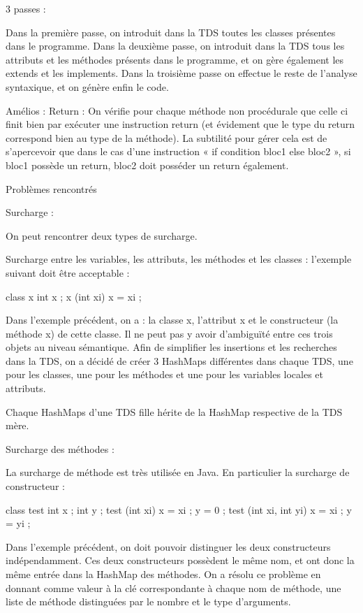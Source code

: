 
3 passes :

Dans la première passe, on introduit dans la TDS toutes les classes présentes dans le programme.
Dans la deuxième passe, on introduit dans la TDS tous les attributs et les méthodes présents dans le programme, et on gère également les extends et les implements.
Dans la troisième passe on effectue le reste de l'analyse syntaxique, et on génère enfin le code.



Amélios :
Return :
On vérifie pour chaque méthode non procédurale que celle ci finit bien par
exécuter une instruction return (et évidement que le type du return correspond
bien au type de la méthode). La subtilité pour gérer cela est de s'apercevoir
que dans le cas d'une instruction « if condition {bloc1} else {bloc2} », si
bloc1 possède un return, bloc2 doit posséder un return également.


Problèmes rencontrés

Surcharge :

On peut rencontrer deux types de surcharge.

Surcharge entre les variables, les attributs, les méthodes et les classes :
l'exemple suivant doit être acceptable :

class x {
  int x ;
  x (int xi) {
    x = xi ;
  }
}

Dans l'exemple précédent, on a : la classe x, l'attribut x et le constructeur
(la méthode x) de cette classe. Il ne peut pas y avoir d’ambiguïté entre ces
trois objets au niveau sémantique. Afin de simplifier les insertions et les
recherches dans la TDS, on a décidé de créer 3 HashMaps différentes dans chaque
TDS, une pour les classes, une pour les méthodes et une pour les variables
locales et attributs.

Chaque HashMaps d'une TDS fille hérite de la HashMap respective de la TDS mère.


Surcharge des méthodes :

La surcharge de méthode est très utilisée en Java. En particulier la surcharge de constructeur :

class test {
   int x ;
   int y ;
   test (int xi) {
     x = xi ;
     y = 0 ;
   }
   test (int xi, int yi) {
     x = xi ;
     y = yi ;
   }
}

Dans l'exemple précédent, on doit pouvoir distinguer les deux constructeurs
indépendamment. Ces deux constructeurs possèdent le même nom, et ont donc la
même entrée dans la HashMap des méthodes. On a résolu ce problème en donnant
comme valeur à la clé correspondante à chaque nom de méthode, une liste de
méthode distinguées par le nombre et le type d'arguments.



